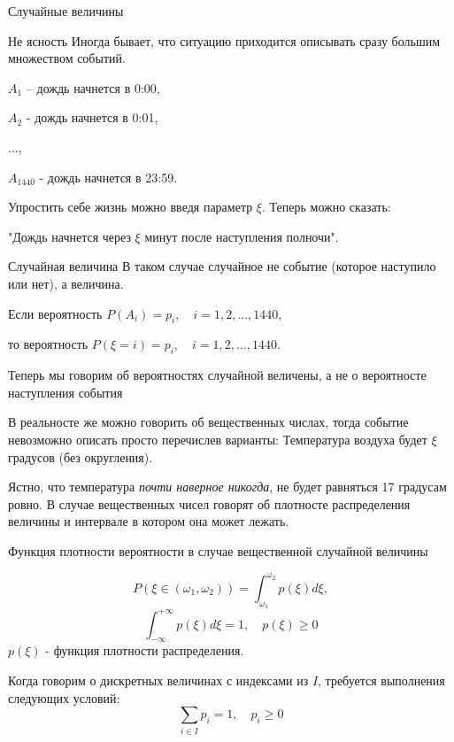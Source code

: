 \documentclass[]{beamer}
\begin{document}
\begin{frame}{Случайные величины}
	\begin{block}{Не ясность}
		Иногда бывает, что ситуацию приходится описывать сразу большим множеством событий. 

		$A_1$ -- дождь начнется в 0:00,

		$A_2$ - дождь начнется в 0:01,

		...,

		$A_{1440}$ - дождь начнется в 23:59.
		
		
		Упростить себе жизнь можно введя параметр $\xi$. Теперь можно сказать:

		"Дождь начнется через $\xi$ минут после наступления полночи".

	\end{block}
	\begin{block}{Случайная величина}
		В таком случае случайное не событие (которое наступило или нет), а величина.
	\end{block}
\end{frame}
\begin{frame}{}
	\begin{block}{}
		Если вероятность $P(A_i) = p_i, \quad i = 1, 2,..., 1440$, 

		то вероятность $P(\xi = i) = p_i, \quad i = 1, 2,..., 1440.$

		
		Теперь мы говорим об вероятностях случайной величены, а не о вероятносте наступления события
	\end{block}

	\begin{block}{}
		В реальносте же можно говорить об вещественных числах, тогда событие невозможно описать 
		просто перечислев варианты: Температура воздуха будет $\xi$ градусов (без округления).
	\end{block}

	\begin{block}{}
		 Ястно, что температура \textit{почти наверное никогда}, не будет равняться 17 градусам ровно.
		 В случае вещественных чисел говорят об плотносте распределения величины и интервале в котором она может лежать. 
	\end{block}
\end{frame}

\begin{frame}{Функция плотности вероятности в случае вещественной случайной величины}	
	\begin{block}{}
	\begin{equation}
		P(\xi \in (\omega_1, \omega_2)) = \int_{\omega_1}^{\omega_2} p(\xi) d \xi ,
	\end{equation}
	\begin{equation}
		\int_{-\infty}^{+\infty} p(\xi) d\xi = 1, \quad  p(\xi) \geq 0
	\end{equation}
	$p(\xi)$ - функция плотности распределения.
	\end{block}
        Когда говорим о дискретных величинах с индексами из $I$, требуется выполнения следующих условий:
	$$\sum_{i \in I} p_i = 1, \quad p_i \geq 0 $$
\end{frame}
\end{document}
